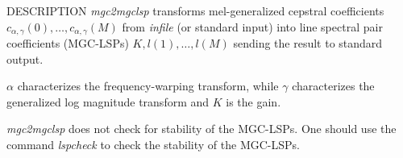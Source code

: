 \begin{synopsis}
\item [mgc2mgclsp] [ --m $M$ ] [ --a $A$] [ --g $G$ ] [ --c $C$ ] [ --o $O$ ]
 [ --s $S$ ] [ --k ] [ --L ] [ {\em infile} ]
\end{synopsis}

\begin{qsection}{DESCRIPTION}
{\em mgc2mgclsp} transforms mel-generalized cepstral coefficients
$c_{\alpha,\gamma}(0), \dots, c_{\alpha,\gamma}(M)$
from {\em infile} (or standard input)
into line spectral pair coefficients (MGC-LSPs) $K, l(1), \dots, l(M)$
sending the result to standard output.

$\alpha$ characterizes the frequency-warping transform,
while $\gamma$ characterizes the generalized log magnitude transform
and $K$ is the gain.

{\em mgc2mgclsp} does not check for stability of the MGC-LSPs.
One should use the command {\em lspcheck} to check the stability of the
MGC-LSPs.

\end{qsection}

\begin{options}
\end{options}

